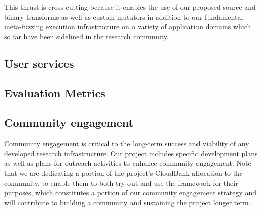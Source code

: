 This thrust is cross-cutting because it enables the use of our proposed source and binary 
transforms as well as custom mutators in addition to our fundamental meta-fuzzing execution
infrastructure on a variety of application domains which so far have been 
sidelined in the research community.


\subsection{User services}
\label{sec:user-services}


\subsection{Evaluation Metrics}


\subsection{Community engagement}


Community engagement is critical to the long-term success and viability of any
developed research infrastructure.  Our project includes specific development
plans as well as plans for outreach activities to enhance community engagement.  
Note that we are dedicating a portion of the project's CloudBank allocation to
the community, to enable them to both try out and use the framework for their
purposes, which constitutes a portion of our community engagement strategy and
will contribute to building a community and sustaining the project longer term. 

